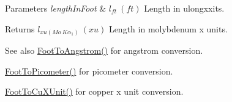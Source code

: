 \begin{DoxyParams}{Parameters}
{\em length\+In\+Foot} & $ l_{ft}\ (ft)$ Length in ulongxxits. \\
\hline
\end{DoxyParams}
\begin{DoxyReturn}{Returns}
$ l_{xu(Mo\ K\alpha_1)}\ (xu)$ Length in molybdenum x units. 
\end{DoxyReturn}
\begin{DoxySeeAlso}{See also}
\mbox{\hyperlink{group___e_g_x_math-_conversions-_length_conversions-_imperial-_foot-_non-_s_i_ga39b1712b38ad7c61cb859376f07decda}{Foot\+To\+Angstrom()}} for angstrom conversion. 

\mbox{\hyperlink{group___e_g_x_math-_conversions-_length_conversions-_imperial-_foot-_s_i_ga2d46da89e13218f0c8d75356c0d03942}{Foot\+To\+Picometer()}} for picometer conversion. 

\mbox{\hyperlink{group___e_g_x_math-_conversions-_length_conversions-_imperial-_foot-_non-_s_i_ga965e1b5a43bec32129d8319540036be1}{Foot\+To\+Cu\+X\+Unit()}} for copper x unit conversion. 
\end{DoxySeeAlso}
